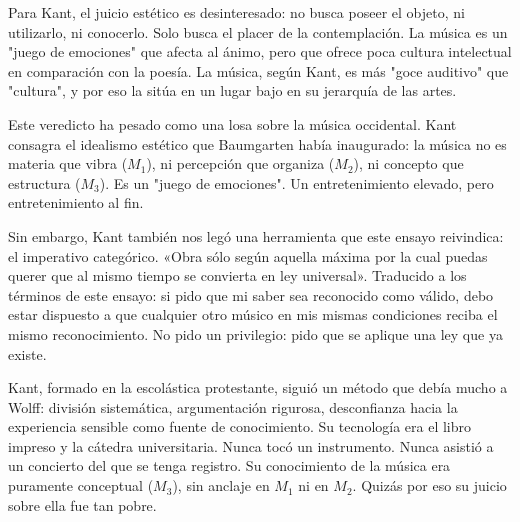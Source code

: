 \documentclass[14pt, a4paper]{article}
\begin{document}
\begin{enumerate}
Para Kant, el juicio estético es desinteresado: no busca poseer el
objeto, ni utilizarlo, ni conocerlo. Solo busca el placer de la
contemplación. La música es un "juego de emociones" que afecta al
ánimo, pero que ofrece poca cultura intelectual en comparación con la
poesía. La música, según Kant, es más "goce auditivo" que "cultura",
y por eso la sitúa en un lugar bajo en su jerarquía de las artes.

Este veredicto ha pesado como una losa sobre la música occidental.
Kant consagra el idealismo estético que Baumgarten había inaugurado:
la música no es materia que vibra (\(M_1\)), ni percepción que organiza
(\(M_2\)), ni concepto que estructura (\(M_3\)). Es un "juego de
emociones". Un entretenimiento elevado, pero entretenimiento al fin.

Sin embargo, Kant también nos legó una herramienta que este ensayo
reivindica: el imperativo categórico. «Obra sólo según aquella máxima
por la cual puedas querer que al mismo tiempo se convierta en ley
universal». Traducido a los términos de este ensayo: si pido que mi
saber sea reconocido como válido, debo estar dispuesto a que
cualquier otro músico en mis mismas condiciones reciba el mismo
reconocimiento. No pido un privilegio: pido que se aplique una ley
que ya existe.

Kant, formado en la escolástica protestante, siguió un método que
debía mucho a Wolff: división sistemática, argumentación rigurosa,
desconfianza hacia la experiencia sensible como fuente de conocimiento.
Su tecnología era el libro impreso y la cátedra universitaria. Nunca
tocó un instrumento. Nunca asistió a un concierto del que se tenga
registro. Su conocimiento de la música era puramente conceptual
(\(M_3\)), sin anclaje en \(M_1\) ni en \(M_2\). Quizás por eso su juicio
sobre ella fue tan pobre.
\end{enumerate}
\end{document}
